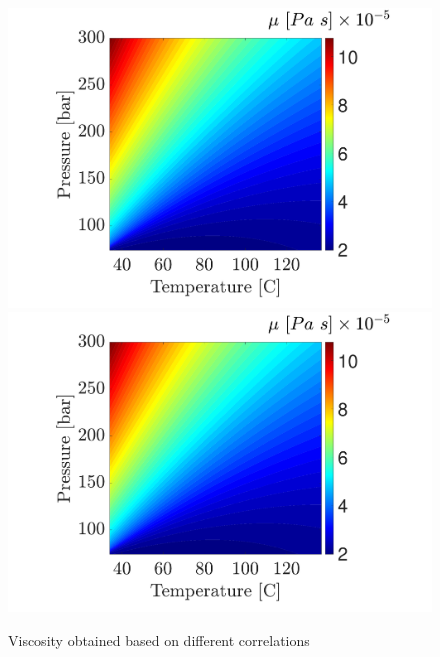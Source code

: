 \documentclass[../Article_Design_of_Experiment.tex]{subfiles}
\begin{document}

        \begin{figure}[H]
			\centering
			\includegraphics[trim = 1.5cm 11.5cm 2.5cm 10.0cm,clip,width=\textwidth]{Figures/MU.pdf}	
			\includegraphics[trim = 1.5cm 4.0cm 2.5cm 19.0cm,clip,width=\textwidth]{Figures/MU.pdf}	
			\caption{Viscosity obtained based on different correlations } 
            \label{fig: SFE_Properties_mu}
		\end{figure} 
			
\end{document}
